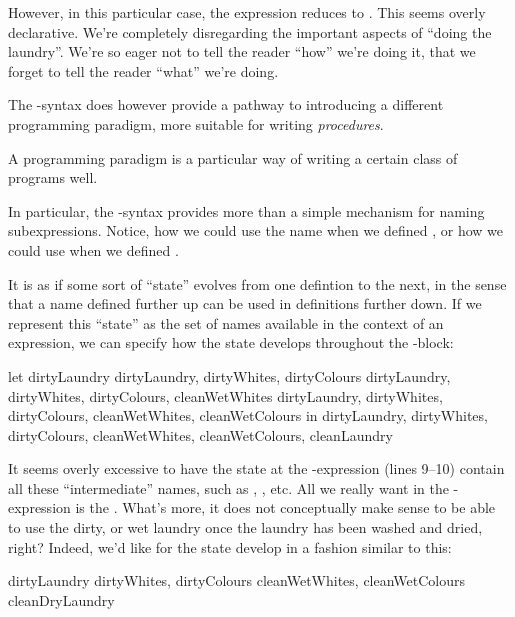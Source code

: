 However, in this particular case, the expression reduces to . This seems overly declarative. We're completely disregarding the
important aspects of ``doing the laundry''. We're so eager not to tell the
reader ``how'' we're doing it, that we forget to tell the reader ``what'' we're
doing.

The -syntax does however provide a pathway to introducing a different
programming paradigm, more suitable for writing \emph{procedures}.

\begin{definition}

A programming paradigm is a particular way of writing a certain class of
programs well.

\end{definition}

In particular,
the -syntax provides more than a simple mechanism for naming
subexpressions. Notice, how we could use the name  when we
defined , or how we could use  when we
defined .

It is as if some sort of ``state'' evolves from one defintion to the next, in
the sense that a name defined further up can be used in definitions further
down. If we represent this ``state'' as the set of names available in the
context of an expression, we can specify how the state develops throughout the
-block: 

\begin{code}
let
  {dirtyLaundry}
  {dirtyLaundry, dirtyWhites, dirtyColours}
  {dirtyLaundry, dirtyWhites, dirtyColours,
    cleanWetWhites}
  {dirtyLaundry, dirtyWhites, dirtyColours,
    cleanWetWhites, cleanWetColours}
in
  {dirtyLaundry, dirtyWhites, dirtyColours,
    cleanWetWhites, cleanWetColours, cleanLaundry}
\end{code}

It seems overly excessive to have the state at the -expression (lines
9--10) contain all these ``intermediate'' names, such as ,
, etc. All we really want in the -expression is
the . What's more, it does not conceptually make sense to be
able to use the dirty, or wet laundry once the laundry has been washed and
dried, right? Indeed, we'd like for the state develop in a fashion similar to
this:

\begin{code}
{dirtyLaundry}
{dirtyWhites, dirtyColours}
{cleanWetWhites, cleanWetColours}
{cleanDryLaundry}
\end{code}

